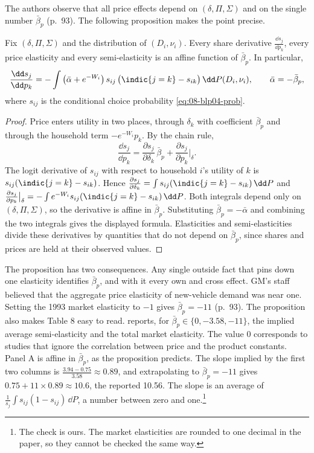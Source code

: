  The authors observe that all price effects depend on $(\delta, \Pi,
\Sigma)$ and on the single number $\bar\beta_p$ (p.~93). The following proposition makes the point precise.

\begin{proposition}\label{prop:08-blp04-affine}
Fix $(\delta, \Pi, \Sigma)$ and the distribution of $(D_i, \nu_i)$. Every share derivative
$\frac{\dd s_j}{\dd p_k}$, every price elasticity and every semi-elasticity is an affine function of
$\bar\beta_p$. In particular,
\[
\frac{\dd s_j}{\dd p_k} = -\int \big(\bar\alpha + e^{-W_i}\big)\, s_{ij}\,\big(\indic\{j=k\} - s_{ik}\big)\,
\dd P(D_i, \nu_i), \qquad \bar\alpha = -\bar\beta_p ,
\]
where $s_{ij}$ is the conditional choice probability \cref{eq:08-blp04-prob}.
\end{proposition}

\begin{proof}
Price enters utility in two places, through $\delta_k$ with coefficient $\bar\beta_p$ and through the
household term $-e^{-W_i}p_k$. By the chain rule,
\[
\frac{\dd s_j}{\dd p_k} = \frac{\partial s_j}{\partial \delta_k}\,\bar\beta_p
+ \frac{\partial s_j}{\partial p_k}\Big|_{\delta}.
\]
The logit derivative of $s_{ij}$ with respect to household $i$'s utility of $k$ is
$s_{ij}(\indic\{j=k\} - s_{ik})$. Hence
$\frac{\partial s_j}{\partial \delta_k} = \int s_{ij}(\indic\{j=k\}-s_{ik})\,\dd P$ and
$\frac{\partial s_j}{\partial p_k}\big|_{\delta} = -\int e^{-W_i}s_{ij}(\indic\{j=k\}-s_{ik})\,\dd P$. Both
integrals depend only on $(\delta, \Pi, \Sigma)$, so the derivative is affine in $\bar\beta_p$. Substituting
$\bar\beta_p = -\bar\alpha$ and combining the two integrals gives the displayed formula. Elasticities and
semi-elasticities divide these derivatives by quantities that do not depend on $\bar\beta_p$, since shares and
prices are held at their observed values.
\end{proof}

The proposition has two consequences. Any single outside fact that pins down one elasticity identifies
$\bar\beta_p$, and with it every own and cross effect. GM's staff believed that the aggregate price elasticity
of new-vehicle demand was near one. Setting the 1993 market elasticity to $-1$ gives $\bar\beta_p = -11$
(p.~93). The proposition also makes Table 8 easy to read.  reports, for
$\bar\beta_p \in \{0, -3.58, -11\}$, the implied average semi-elasticity and the total market elasticity. The
value 0 corresponds to studies that ignore the correlation between price and the product constants. Panel A is
affine in $\bar\beta_p$, as the proposition predicts. The slope implied by the first two columns is
$\frac{3.94 - 0.75}{3.58} \approx 0.89$, and extrapolating to $\bar\beta_p = -11$ gives
$0.75 + 11 \times 0.89 \approx 10.6$, the reported 10.56. The slope is an average of
$\frac{1}{s_j}\int s_{ij}(1-s_{ij})\,\dd P$, a number between zero and one.\footnote{The check is ours. The
market elasticities are rounded to one decimal in the paper, so they cannot be checked the same way.}

